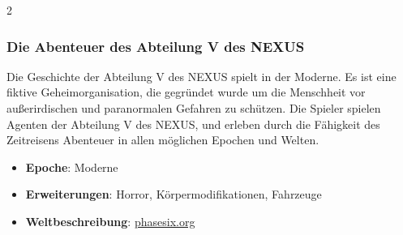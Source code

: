 \begin{multicols}{2}
{\subsubsection{Die Abenteuer des Abteilung V des NEXUS}

Die Geschichte der Abteilung V des NEXUS spielt in der Moderne. Es ist eine fiktive Geheimorganisation, die gegründet wurde um die Menschheit vor außerirdischen und paranormalen Gefahren zu schützen. Die Spieler spielen Agenten der Abteilung V des NEXUS, und erleben durch die Fähigkeit des Zeitreisens Abenteuer in allen möglichen Epochen und Welten.
\begin{itemize}
    \item \textbf{Epoche}: Moderne
    \item \textbf{Erweiterungen}: Horror, Körpermodifikationen, Fahrzeuge
    \item \textbf{Weltbeschreibung}: \href{https://phasesix.org/world/nexus}{phasesix.org}
\end{itemize}
}{}
\end{multicols}
